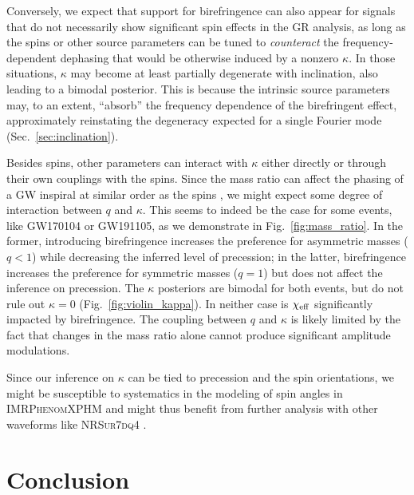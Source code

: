 \documentclass[aps,prd,twocolumn,superscriptaddress,preprintnumbers,nofootinbib]{revtex4-2}
\begin{document}
Conversely, we expect that support for birefringence can also appear for signals that do not necessarily show significant spin effects in the \ac{GR} analysis, as long as the spins or other source parameters can be tuned to \emph{counteract} the frequency-dependent dephasing that would be otherwise induced by a nonzero $\kappa$.
In those situations, $\kappa$ may become at least partially degenerate with inclination, also leading to a bimodal posterior.
This is because the intrinsic source parameters may, to an extent, ``absorb'' the frequency dependence of the birefringent effect, approximately reinstating the degeneracy expected for a single Fourier mode (Sec.~\ref{sec:inclination}).

Besides spins, other parameters can interact with $\kappa$ either directly or through their own couplings with the spins.
Since the mass ratio can affect the phasing of a \ac{GW} inspiral at similar order as the spins \cite{Blanchet:2013haa}, we might expect some degree of interaction between $q$ and $\kappa$.
This seems to indeed be the case for some events, like GW170104 or GW191105, as we demonstrate in Fig.~\ref{fig:mass_ratio}.
In the former, introducing birefringence increases the preference for asymmetric masses ($q < 1$) while decreasing the inferred level of precession; in the latter, birefringence increases the preference for symmetric masses ($q = 1$) but does not affect the inference on precession.
The $\kappa$ posteriors are bimodal for both events, but do not rule out $\kappa = 0$ (Fig.~\ref{fig:violin_kappa}).
In neither case is $\chi_{\rm eff}$ significantly impacted by birefringence.
The coupling between $q$ and $\kappa$ is likely limited by the fact that changes in the mass ratio alone cannot produce significant amplitude modulations.

Since our inference on $\kappa$ can be tied to precession and the spin orientations, we might be susceptible to systematics in the modeling of spin angles in \textsc{IMRPhenomXPHM} and might thus benefit from further analysis with other waveforms like \textsc{NRSur7dq4} \cite{Varma:2018mmi}.

\section{Conclusion}
\label{sec:Conclusion}
\end{document}
